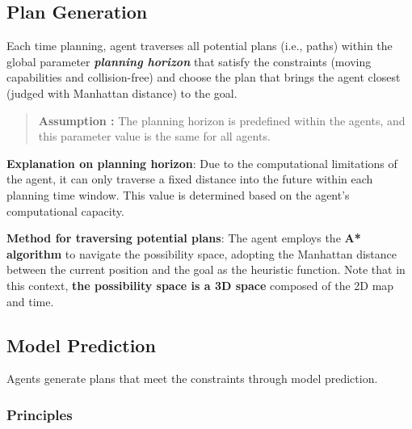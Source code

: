 \subsection{Plan Generation}
\label{chap:plan generation}

Each time planning, agent traverses all potential plans (i.e., paths) within the global parameter \textbf{\textit{planning horizon}} that satisfy the constraints (moving capabilities and collision-free) and choose the plan that brings the agent closest (judged with Manhattan distance) to the goal.

\begin{quotation}
    \textbf{Assumption :}  
    The planning horizon is predefined within the agents, and this parameter value is the same for all agents.
\end{quotation}

\textbf{Explanation on planning horizon}: Due to the computational limitations of the agent, it can only traverse a fixed distance into the future within each planning time window. This value is determined based on the agent's computational capacity.

\textbf{Method for traversing potential plans}: 
The agent employs the \textbf{A* algorithm} to navigate the possibility space, adopting the Manhattan distance between the current position and the goal as the heuristic function.
Note that in this context, \textbf{the possibility space is a 3D space} composed of the 2D map and time.


\subsection{Model Prediction}
\label{chap:model prediction}

Agents generate plans that meet the constraints through model prediction.

\subsubsection{Principles}

